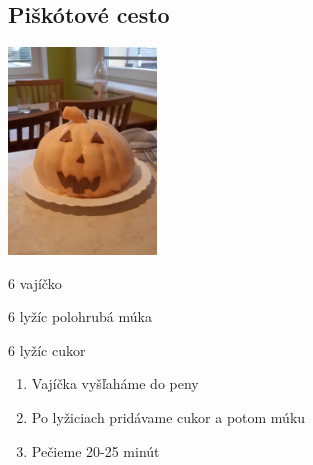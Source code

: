 \setcounter{step}{0}
\subsection{Piškótové cesto}

\begin{ingredient}
\includegraphics[height=5.5cm]{images/pistkot_krem_salko}
\def\portions{8}%

\begin{main}
	\item 6 vajíčko
	\item 6 lyžíc polohrubá múka
	\item 6 lyžíc cukor
\end{main}
\end{ingredient}
\begin{recipe}

\begin{enumerate}
\item{Vajíčka vyšľaháme do peny}
\item{Po lyžiciach pridávame cukor a potom múku}
\item{Pečieme 20-25 minút}
\end{enumerate}
\end{recipe}

\begin{notes}

\end{notes}
\clearpage	